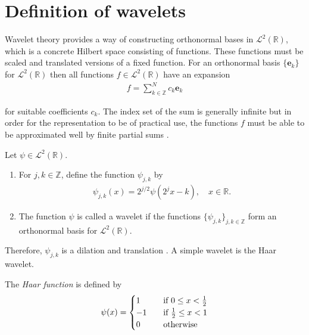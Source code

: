 \section{Definition of wavelets}
Wavelet theory provides a way of constructing orthonormal bases in $\mathcal{L}^2(\mathbb{R})$, which is a concrete Hilbert space consisting of functions. These functions must be scaled and translated versions of a fixed function. For an orthonormal basis $\{\textbf{e}_k\}$ for $\mathcal{L}^2(\mathbb{R})$ then all functions $f \in \mathcal{L}^2(\mathbb{R})$ have an expansion
\begin{align*}
f = \sum_{k\in\mathbb{Z}}^N c_k \textbf{e}_k
\end{align*}

for suitable coefficients $c_k$. The index set of the sum is generally infinite but in order for the representation to be of practical use, the functions $f$ must be able to be approximated well by finite partial sums \cite{page 160, FSE2010}.

\begin{definition}[Wavelet]
Let $\psi \in \mathcal{L}^2(\mathbb{R})$.
\begin{enumerate}
\item For $j,k \in \mathbb{Z}$, define the function $\psi_{j,k}$ by
\begin{align*}
\psi_{j,k}(x) = 2^{j/2} \psi(2^jx-k), \quad x \in \mathbb{R}.
\end{align*}
\item The function $\psi$ is called a wavelet if the functions $\{\psi_{j,k}\}_{j,k\in\mathbb{Z}}$ form an orthonormal basis for $\mathcal{L}^2(\mathbb{R})$.
\end{enumerate}
\end{definition}

Therefore, $\psi_{j,k}$ is a dilation and translation . A simple wavelet is the Haar wavelet.

\begin{definition} \label{HaarWave}
The \textit{Haar function} is defined by
\begin{align*}
\psi(x) =
\begin{cases}
1 \quad &\textnormal{if } 0 \leq x < \frac{1}{2} \\
-1 \quad &\textnormal{if } \frac{1}{2} \leq x  < 1 \\
0 \quad &\textnormal{otherwise}
\end{cases}
\end{align*}
\end{definition}

